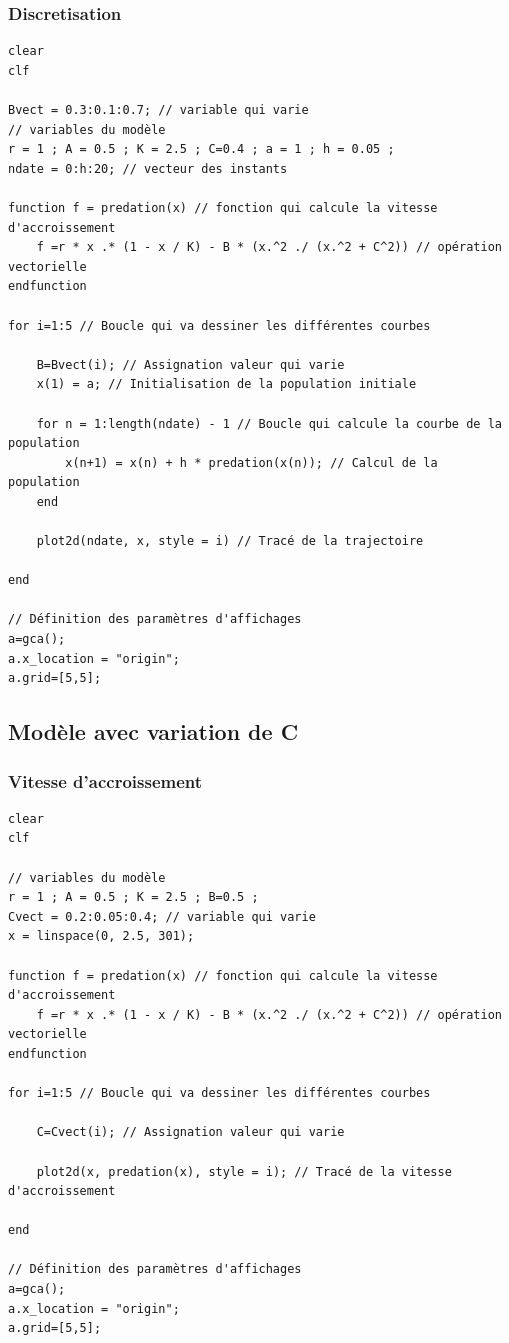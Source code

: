 \documentclass{article}
\begin{document}
\subsubsection{Discretisation}

\begin{verbatim}
clear
clf

Bvect = 0.3:0.1:0.7; // variable qui varie
// variables du modèle
r = 1 ; A = 0.5 ; K = 2.5 ; C=0.4 ; a = 1 ; h = 0.05 ;
ndate = 0:h:20; // vecteur des instants

function f = predation(x) // fonction qui calcule la vitesse d'accroissement
    f =r * x .* (1 - x / K) - B * (x.^2 ./ (x.^2 + C^2)) // opération vectorielle
endfunction

for i=1:5 // Boucle qui va dessiner les différentes courbes
    
    B=Bvect(i); // Assignation valeur qui varie
    x(1) = a; // Initialisation de la population initiale
    
    for n = 1:length(ndate) - 1 // Boucle qui calcule la courbe de la population
        x(n+1) = x(n) + h * predation(x(n)); // Calcul de la population
    end
    
    plot2d(ndate, x, style = i) // Tracé de la trajectoire

end

// Définition des paramètres d'affichages
a=gca();
a.x_location = "origin";
a.grid=[5,5];
\end{verbatim}


\subsection{Modèle avec variation de C}

\subsubsection{Vitesse d'accroissement}

\begin{verbatim}
clear
clf

// variables du modèle
r = 1 ; A = 0.5 ; K = 2.5 ; B=0.5 ;
Cvect = 0.2:0.05:0.4; // variable qui varie
x = linspace(0, 2.5, 301);

function f = predation(x) // fonction qui calcule la vitesse d'accroissement
    f =r * x .* (1 - x / K) - B * (x.^2 ./ (x.^2 + C^2)) // opération vectorielle
endfunction

for i=1:5 // Boucle qui va dessiner les différentes courbes
 
    C=Cvect(i); // Assignation valeur qui varie

    plot2d(x, predation(x), style = i); // Tracé de la vitesse d'accroissement

end

// Définition des paramètres d'affichages
a=gca();
a.x_location = "origin";
a.grid=[5,5];
\end{verbatim}
\end{document}
